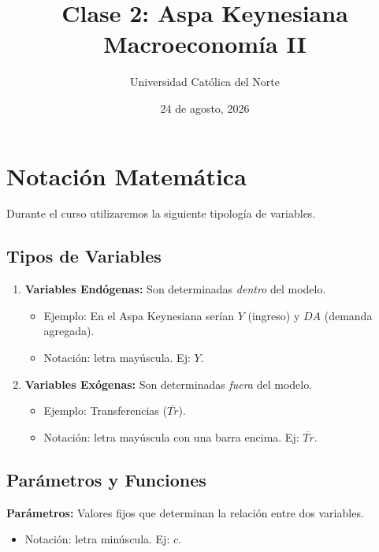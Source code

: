 \documentclass[11pt,a4paper]{article}
\title{\textbf{Clase 2: Aspa Keynesiana} \\ \large Macroeconomía II}
\author{Universidad Católica del Norte}
\date{24 de agosto, 2026}
\newcommand{\barvar}[1]{\overline{#1}}
\begin{document}
\maketitle
\tableofcontents
\newpage

\section{Notación Matemática}

Durante el curso utilizaremos la siguiente tipología de variables.

\subsection{Tipos de Variables}

\begin{enumerate}[label=\alph*)]
    \item \textbf{Variables Endógenas:} Son determinadas \emph{dentro} del modelo.
    \begin{itemize}
        \item Ejemplo: En el Aspa Keynesiana serían $Y$ (ingreso) y $DA$ (demanda agregada).
        \item Notación: letra mayúscula. Ej: $Y$.
    \end{itemize}

    \item \textbf{Variables Exógenas:} Son determinadas \emph{fuera} del modelo.
    \begin{itemize}
        \item Ejemplo: Transferencias ($\barvar{Tr}$).
        \item Notación: letra mayúscula con una barra encima. Ej: $\barvar{Tr}$.
    \end{itemize}
\end{enumerate}

\subsection{Parámetros y Funciones}

\textbf{Parámetros:} Valores fijos que determinan la relación entre dos variables.
\begin{itemize}
    \item Notación: letra minúscula. Ej: $c$.
\end{itemize}
\end{document}
